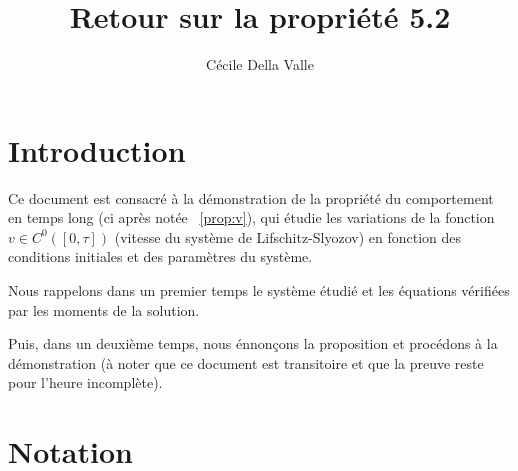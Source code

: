 \documentclass[a4paper]{article}
\title{Retour sur la propriété 5.2}
\author{Cécile Della Valle}
\begin{document}
\maketitle


\section{Introduction}

Ce document est consacré à la démonstration de la propriété 
du comportement en temps long
(ci après notée ~\ref{prop:v}), 
qui étudie les variations de la fonction $v \in C^0([0,\tau])$ 
(vitesse du système de Lifschitz-Slyozov) 
en fonction des conditions initiales et des paramètres du système.

Nous rappelons dans un premier temps le système étudié et les équations vérifiées par les moments de la solution.

Puis, dans un deuxième temps, nous énnonçons la proposition et procédons à la démonstration 
(à noter que ce document est transitoire et que la preuve reste pour l'heure incomplète).


\section{Notation}
\end{document}
